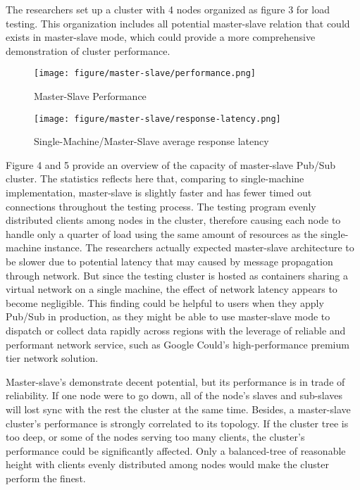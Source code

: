 The researchers set up a cluster with 4 nodes organized as figure 3 for load testing. This organization includes all potential master-slave relation that could exists in master-slave mode, which could provide a more comprehensive demonstration of cluster performance.
	
\begin{figure}[H]
	\centering
	\texttt{[image: figure/master-slave/performance.png]}
	\caption{Master-Slave Performance}
\end{figure}

\begin{figure}[H]
	\centering
	\texttt{[image: figure/master-slave/response-latency.png]}
	\caption{Single-Machine/Master-Slave average response latency}
\end{figure}

Figure 4 and 5 provide an overview of the capacity of master-slave Pub/Sub cluster. The statistics reflects here that, comparing to single-machine implementation, master-slave is slightly faster and has fewer timed out connections throughout the testing process. The testing program evenly distributed clients among nodes in the cluster, therefore causing each node  to handle only a quarter of load using the same amount of resources as the single-machine instance. The researchers actually expected master-slave architecture to be slower due to potential latency that may caused by message propagation through network. But since the testing cluster is hosted as containers sharing a virtual network on a single machine, the effect of network latency appears to become negligible. This finding could be helpful to users when they apply Pub/Sub in production, as they might be able to use master-slave mode to dispatch or collect data rapidly across regions with the leverage of reliable and performant network service, such as Google Could's high-performance premium tier network solution\citep{google-cloud-network}.

Master-slave's demonstrate decent potential, but its performance is in trade of reliability. If one node were to go down, all of the node's slaves and sub-slaves will lost sync with the rest the cluster at the same time. Besides, a master-slave cluster's performance is strongly correlated to its topology. If the cluster tree is too deep, or some of the nodes serving too many clients, the cluster's performance could be significantly affected. Only a balanced-tree of reasonable height with clients evenly distributed among nodes would make the cluster perform the finest. 
